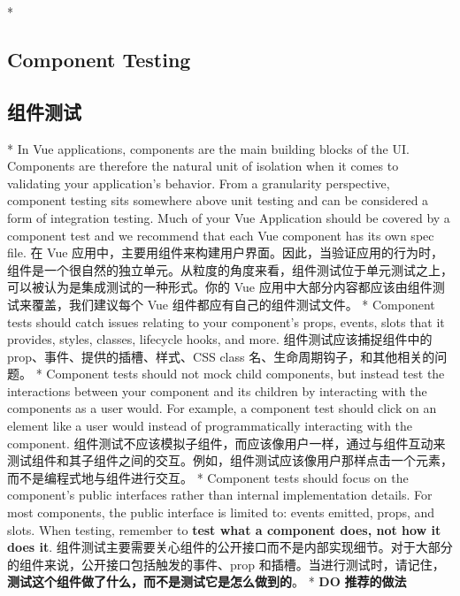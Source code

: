 \begin{paracol}{2}
 
\switchcolumn[0]*%
\subsection{Component Testing}
\switchcolumn
\subsection{组件测试}
\switchcolumn[0]*%
In Vue applications, components are the main building blocks of the UI.
Components are therefore the natural unit of isolation when it comes to
validating your application's behavior. From a granularity perspective,
component testing sits somewhere above unit testing and can be
considered a form of integration testing. Much of your Vue Application
should be covered by a component test and we recommend that each Vue
component has its own spec file.
\switchcolumn
在 Vue
应用中，主要用组件来构建用户界面。因此，当验证应用的行为时，组件是一个很自然的独立单元。从粒度的角度来看，组件测试位于单元测试之上，可以被认为是集成测试的一种形式。你的
Vue 应用中大部分内容都应该由组件测试来覆盖，我们建议每个 Vue
组件都应有自己的组件测试文件。
\switchcolumn[0]*%
Component tests should catch issues relating to your component's props,
events, slots that it provides, styles, classes, lifecycle hooks, and
more.
\switchcolumn
组件测试应该捕捉组件中的 prop、事件、提供的插槽、样式、CSS class
名、生命周期钩子，和其他相关的问题。
\switchcolumn[0]*%
Component tests should not mock child components, but instead test the
interactions between your component and its children by interacting with
the components as a user would. For example, a component test should
click on an element like a user would instead of programmatically
interacting with the component.
\switchcolumn
组件测试不应该模拟子组件，而应该像用户一样，通过与组件互动来测试组件和其子组件之间的交互。例如，组件测试应该像用户那样点击一个元素，而不是编程式地与组件进行交互。
\switchcolumn[0]*%
Component tests should focus on the component's public interfaces rather
than internal implementation details. For most components, the public
interface is limited to: events emitted, props, and slots. When testing,
remember to \textbf{test what a component does, not how it does it}.
\switchcolumn
组件测试主要需要关心组件的公开接口而不是内部实现细节。对于大部分的组件来说，公开接口包括触发的事件、prop
和插槽。当进行测试时，请记住，\textbf{测试这个组件做了什么，而不是测试它是怎么做到的}。
\switchcolumn[0]*%
\textbf{DO}
\switchcolumn
\textbf{推荐的做法}
\end{paracol}


